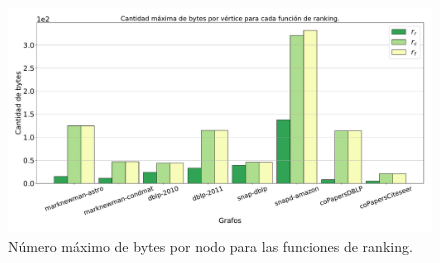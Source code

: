 \begin{figure}
    	\centering
    	\includegraphics[width=1\linewidth]{img/maxBytes.pdf}
    	
    \caption{Número máximo de bytes por nodo para las funciones de ranking.}
    \label{fig:maxBytes}
\end{figure}

